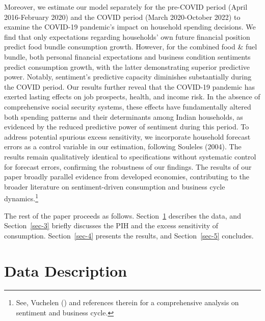 \documentclass[
  abstract]{scrartcl}
\begin{document}
Moreover, we estimate our model separately for the pre-COVID period
(April 2016-February 2020) and the COVID period (March 2020-October
2022) to examine the COVID-19 pandemic's impact on household spending
decisions. We find that only expectations regarding households' own
future financial position predict food bundle consumption growth.
However, for the combined food \& fuel bundle, both personal financial
expectations and business condition sentiments predict consumption
growth, with the latter demonstrating superior predictive power.
Notably, sentiment's predictive capacity diminishes substantially during
the COVID period. Our results further reveal that the COVID-19 pandemic
has exerted lasting effects on job prospects, health, and income risk.
In the absence of comprehensive social security systems, these effects
have fundamentally altered both spending patterns and their determinants
among Indian households, as evidenced by the reduced predictive power of
sentiment during this period. To address potential spurious excess
sensitivity, we incorporate household forecast errors as a control
variable in our estimation, following Souleles (2004). The results
remain qualitatively identical to specifications without systematic
control for forecast errors, confirming the robustness of our findings.
The results of our paper broadly parallel evidence from developed
economies, contributing to the broader literature on sentiment-driven
consumption and business cycle dynamics.\footnote{See, Vuchelen
  () and references therein for
  a comprehensive analysis on sentiment and business cycle.}

The rest of the paper proceeds as follows. Section~\ref{sec-2} describes
the data, and Section~\ref{sec-3} briefly discusses the PIH and the
excess sensitivity of consumption. Section~\ref{sec-4} presents the
results, and Section~\ref{sec-5} concludes.

\section{Data Description}\label{sec-2}
\end{document}
